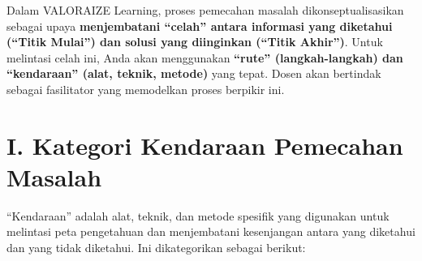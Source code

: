 \documentclass[
  letterpaper,
  DIV=11,
  numbers=noendperiod]{scrreprt}
\begin{document}
Dalam VALORAIZE Learning, proses pemecahan masalah dikonseptualisasikan
sebagai upaya \textbf{menjembatani ``celah'' antara informasi yang
diketahui (``Titik Mulai'') dan solusi yang diinginkan (``Titik
Akhir'')}. Untuk melintasi celah ini, Anda akan menggunakan
\textbf{``rute'' (langkah-langkah) dan ``kendaraan'' (alat, teknik,
metode)} yang tepat. Dosen akan bertindak sebagai fasilitator yang
memodelkan proses berpikir ini.

\section{\texorpdfstring{\textbf{I. Kategori Kendaraan Pemecahan
Masalah}}{I. Kategori Kendaraan Pemecahan Masalah}}\label{i.-kategori-kendaraan-pemecahan-masalah}

``Kendaraan'' adalah alat, teknik, dan metode spesifik yang digunakan
untuk melintasi peta pengetahuan dan menjembatani kesenjangan antara
yang diketahui dan yang tidak diketahui. Ini dikategorikan sebagai
berikut:
\end{document}
